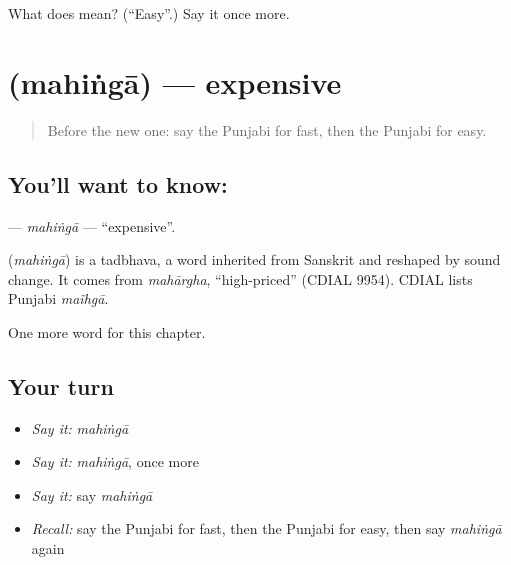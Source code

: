 \begin{tcolorbox}[breakable,colback=teal!4,colframe=teal!35!black,title={Before you move on}]
What does  mean? (\textquotedblleft{}Easy\textquotedblright{}.) Say it once more.
\end{tcolorbox}
\section[\texorpdfstring{\pa{ਮਹਿੰਗਾ} (mahiṅgā)}{ਮਹਿੰਗਾ (mahiṅgā)}]{ (mahiṅgā) — expensive}

\label{lesson:PA-C81-mahinga}



\begin{quote}
Before the new one: say the Punjabi for fast, then the Punjabi for easy.
\end{quote}

\subsection*{You'll want to know: }
\textbf{} — \emph{mahiṅgā} — \textquotedblleft{}expensive\textquotedblright{}.

\begin{cousinweb}
\textbf{} (\emph{mahiṅgā}) is a tadbhava, a word inherited from Sanskrit and reshaped by sound change. It comes from \emph{mahārgha}, \textquotedblleft{}high-priced\textquotedblright{} (CDIAL 9954). CDIAL lists Punjabi \emph{maĩhgā}.
\end{cousinweb}

\begin{grammarlens}[title={What you've built}]
One more word for this chapter.
\end{grammarlens}

\subsection*{Your turn}
\begin{itemize}
\raggedright
  \item \emph{Say it:} \emph{mahiṅgā}
  \item \emph{Say it:} \emph{mahiṅgā}, once more
  \item \emph{Say it:} say \emph{mahiṅgā}
  \item \emph{Recall:} say the Punjabi for fast, then the Punjabi for easy, then say \emph{mahiṅgā} again
\end{itemize}

